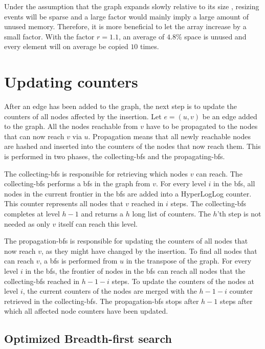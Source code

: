Under the assumption that the graph expands slowly relative to its size , resizing events will be sparse and a large factor would mainly imply a large amount of unused memory. Therefore, it is more beneficial to let the array increase by a small factor. With the factor $r = 1.1$, an average of $4.8$\% space is unused and every element will on average be copied $10$ times.

\section{Updating counters}

After an edge has been added to the graph, the next step is to update the counters of all nodes affected by the insertion. Let $e = (u,v)$ be an edge added to the graph. All the nodes reachable from $v$ have to be propagated to the nodes that can now reach $v$ via $u$. Propagation means that all newly reachable nodes are hashed and inserted into the counters of the nodes that now reach them. This is performed in two phases, the collecting-bfs and the propagating-bfs.

The collecting-bfs is responsible for retrieving which nodes $v$ can reach. The collecting-bfs performs a bfs in the graph from $v$. For every level $i$ in the bfs, all nodes in the current frontier in the bfs are added into a HyperLogLog counter. This counter represents all nodes that $v$ reached in $i$ steps. The collecting-bfs completes at level $h-1$ and returns a $h$ long list of counters. The $h$'th step is not needed as only $v$ itself can reach this level.

The propagation-bfs is responsible for updating the counters of all nodes that now reach $v$, as they might have changed by the insertion. To find all nodes that can reach $v$, a bfs is performed from $u$ in the transpose of the graph. For every level $i$ in the bfs, the frontier of nodes in the bfs can reach all nodes that the collecting-bfs reached in $h-1-i$ steps. To update the counters of the nodes at level $i$, the current counters of the nodes are merged with the $h-1-i$ counter retrieved in the collecting-bfs. The propagation-bfs stops after $h-1$ steps after which all affected node counters have been updated.


\subsection{Optimized Breadth-first search}


